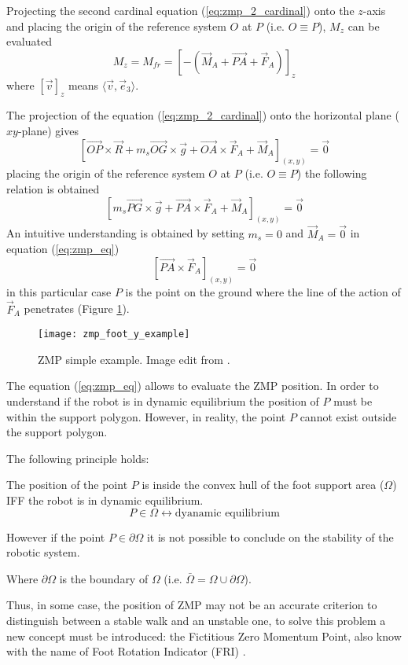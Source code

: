 Projecting the second cardinal equation (\ref{eq:zmp_2_cardinal}) onto the $z$-axis and placing the
origin of the reference system $O$ at $P$ (i.e. $O \equiv P$), $M_z$ can be evaluated
\[
M_z = M_{fr} = [-(\vec{M}_A + \vec{PA} + \vec{F}_A)]_z
\]
where $[\vec{v}]_z$ means $\langle \vec{v},\vec{e}_3 \rangle$.
\par
The projection of the equation (\ref{eq:zmp_2_cardinal}) onto the horizontal plane ($xy$-plane) gives
\[
\left[\vec{OP} \times \vec{R} + m_s \vec{OG} \times \vec{g} + \vec{OA} \times \vec{F}_A + \vec{M}_A\right]_{(x,y)} = \vec{0}
\]
placing the origin of the reference system $O$ at $P$ (i.e. $O \equiv P$) the following relation is
obtained
\begin{equation}
  \label{eq:zmp_eq}
  \left[ m_s \vec{PG} \times \vec{g} + \vec{PA} \times \vec{F}_A + \vec{M}_A\right]_{(x,y)} = \vec{0}
\end{equation}
An intuitive understanding is obtained by setting $m_s = 0$ and $\vec{M}_A = \vec{0}$ in equation
(\ref{eq:zmp_eq})
\[
\left[\vec{PA} \times \vec{F}_A\right]_{(x,y)} = \vec{0}
\]
in this particular case $P$ is the point on the ground where the line of the action of $\vec{F}_A$
penetrates (Figure \ref{fig:zmp_foot_y_example}).
\begin{figure}[!ht]
  \centering
  \texttt{[image: zmp\_foot\_y\_example]}
  \caption{ZMP simple example. Image edit from \cite{Vukobratov2004}. \label{fig:zmp_foot_y_example}}
\end{figure}
The equation (\ref{eq:zmp_eq}) allows to evaluate the ZMP position. In order to understand if the robot
is in dynamic equilibrium the position of $P$ must be within the support polygon. However, in reality, the
point $P$ cannot exist outside the support polygon.
\par
The following principle holds:
\begin{principle}
  \label{principle:zmp}
  The position of the point $P$ is inside the convex hull of the foot support area ($\Omega$)
  IFF the robot is in dynamic equilibrium.
  \[
  P \in \Omega \longleftrightarrow \text{dyanamic equilibrium}
  \]
  \par
  However if the point $P \in \partial \Omega$ it is not possible to conclude on the stability of the robotic system.
  \par
  Where $\partial \Omega$ is the boundary of $\Omega$ (i.e. $\bar{\Omega} = \Omega \cup \partial \Omega$).
\end{principle}
Thus, in some case, the position of ZMP may not be an accurate criterion to distinguish between a
stable walk and an unstable one, to solve this problem a new concept must be introduced: the
Fictitious Zero Momentum Point, also know with the name of Foot Rotation Indicator (FRI)
\cite{Goswami1999}.

